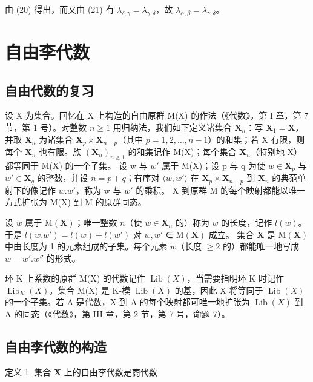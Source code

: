 由 (20) 得出，而又由 (21) 有 \(\lambda_{\delta, \gamma} = \lambda_{\gamma, \delta}\)，故 \(\lambda_{\alpha, \beta} = \lambda_{\gamma, \delta}\)。

\section{自由李代数}

\subsection{自由代数的复习}

设 X 为集合。回忆在 X 上构造的自由原群 M(X) 的作法（《代数》，第 I 章，第 7 节，第 1 号）。对整数 \(n \geqslant 1\) 用归纳法，我们如下定义诸集合 \(\mathbf{X}_n\)：写 \(\mathbf{X}_1 = \mathbf{X}\)，并取 \(\mathbf{X}_n\) 为诸集合 \(\mathbf{X}_p \times \mathbf{X}_{n-p}\)（其中 \(p = 1, 2, \ldots, n-1\)）的和集；若 X 有限，则每个 \(\mathbf{X}_n\) 也有限。族 \((\mathbf{X}_n)_{n \geqslant 1}\) 的和集记作 M(X)；每个集合 \(\mathbf{X}_n\)（特别地 X）都等同于 M(X) 的一个子集。 设 w 与 \(w'\) 属于 M(X)；设 p 与 q 为使 \(w \in \mathbf{X}_p\) 与 \(w' \in \mathbf{X}_q\) 的整数，并设 \(n = p + q\)；有序对 \(\langle w, w' \rangle\) 在 \(\mathbf{X}_p \times \mathbf{X}_{n-p}\) 到 \(\mathbf{X}_n\) 的典范单射下的像记作 \(w.w'\)，称为 w 与 \(w'\) 的乘积。 X 到原群 M 的每个映射都能以唯一方式扩张为 M(X) 到 M 的原群同态。

设 \(w\) 属于 \(\mathrm{M}(\mathbf{X})\)；唯一整数 \(n\)（使 \(w \in \mathbf{X}_n\) 的）称为 \(w\) 的长度，记作 \(l(w)\)。于是 \(l(w.w') = l(w) + l(w')\) 对 \(w, w'\) ∈ \(\mathrm{M}(\mathbf{X})\) 成立。 集合 \(\mathbf{X}\) 是 \(\mathrm{M}(\mathbf{X})\) 中由长度为 1 的元素组成的子集。每个元素 \(w\)（长度 \(\geqslant 2\) 的）都能唯一地写成 \(w = w'.w''\) 的形式。

环 K 上系数的原群 M(X) 的代数记作 \(\operatorname{Lib}(X)\)，当需要指明环 K 时记作 \(\operatorname{Lib}_{K}(X)\)。集合 M(X) 是 K-模 \(\operatorname{Lib}(X)\) 的基，因此 X 将等同于 \(\operatorname{Lib}(X)\) 的一个子集。若 A 是代数，X 到 A 的每个映射都可唯一地扩张为 \(\operatorname{Lib}(X)\) 到 A 的同态（《代数》，第 III 章，第 2 节，第 7 号，命题 7）。

\subsection{自由李代数的构造}

定义 1. 集合 \(\mathbf{X}\) 上的自由李代数是商代数

